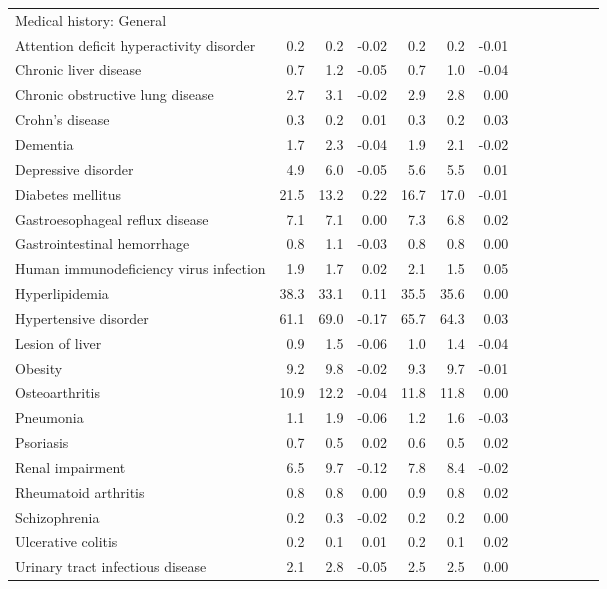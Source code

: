 \documentclass[11pt,]{article}
\begin{document}
\begin{longtable}{lrrrrrrrrrrrr}
  Medical history: General &    &    &     &    &    &     \\ 
      Attention deficit hyperactivity disorder &  0.2 &  0.2 & -0.02 &  0.2 &  0.2 & -0.01 \\ 
      Chronic liver disease &  0.7 &  1.2 & -0.05 &  0.7 &  1.0 & -0.04 \\ 
      Chronic obstructive lung disease &  2.7 &  3.1 & -0.02 &  2.9 &  2.8 &  0.00 \\ 
      Crohn's disease &  0.3 &  0.2 &  0.01 &  0.3 &  0.2 &  0.03 \\ 
      Dementia &  1.7 &  2.3 & -0.04 &  1.9 &  2.1 & -0.02 \\ 
      Depressive disorder &  4.9 &  6.0 & -0.05 &  5.6 &  5.5 &  0.01 \\ 
      Diabetes mellitus & 21.5 & 13.2 &  0.22 & 16.7 & 17.0 & -0.01 \\ 
      Gastroesophageal reflux disease &  7.1 &  7.1 &  0.00 &  7.3 &  6.8 &  0.02 \\ 
      Gastrointestinal hemorrhage &  0.8 &  1.1 & -0.03 &  0.8 &  0.8 &  0.00 \\ 
      Human immunodeficiency virus infection &  1.9 &  1.7 &  0.02 &  2.1 &  1.5 &  0.05 \\ 
      Hyperlipidemia & 38.3 & 33.1 &  0.11 & 35.5 & 35.6 &  0.00 \\ 
      Hypertensive disorder & 61.1 & 69.0 & -0.17 & 65.7 & 64.3 &  0.03 \\ 
      Lesion of liver &  0.9 &  1.5 & -0.06 &  1.0 &  1.4 & -0.04 \\ 
      Obesity &  9.2 &  9.8 & -0.02 &  9.3 &  9.7 & -0.01 \\ 
      Osteoarthritis & 10.9 & 12.2 & -0.04 & 11.8 & 11.8 &  0.00 \\ 
      Pneumonia &  1.1 &  1.9 & -0.06 &  1.2 &  1.6 & -0.03 \\ 
      Psoriasis &  0.7 &  0.5 &  0.02 &  0.6 &  0.5 &  0.02 \\ 
      Renal impairment &  6.5 &  9.7 & -0.12 &  7.8 &  8.4 & -0.02 \\ 
      Rheumatoid arthritis &  0.8 &  0.8 &  0.00 &  0.9 &  0.8 &  0.02 \\ 
      Schizophrenia &  0.2 &  0.3 & -0.02 &  0.2 &  0.2 &  0.00 \\ 
      Ulcerative colitis &  0.2 &  0.1 &  0.01 &  0.2 &  0.1 &  0.02 \\ 
      Urinary tract infectious disease &  2.1 &  2.8 & -0.05 &  2.5 &  2.5 &  0.00 \\ 

\end{longtable}
\end{document}
